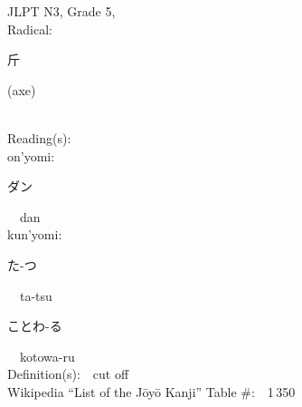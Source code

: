 \begin{multicols}{2}
{JLPT N3, Grade 5, \\Radical:\ \ {\begin{CJK}{UTF8}{min} 斤 \end{CJK}} (axe) } \\
Reading(s):\ \ \\
{\hspace*{1em}}on'yomi:\ \ \\
{\hspace*{2em}}{\begin{CJK}{UTF8}{min} ダン \end{CJK}}\ \ dan\ \ \\
{\hspace*{1em}}kun'yomi:\ \ \\
{\hspace*{2em}}{\begin{CJK}{UTF8}{min} た-つ \end{CJK}}\ \ ta-tsu\ \ \\
{\hspace*{2em}}{\begin{CJK}{UTF8}{min} ことわ-る \end{CJK}}\ \ kotowa-ru\ \ \\
Definition(s):\ \ cut off \\
Wikipedia ``List of the J\=oy\=o Kanji'' Table \#:\ \ 1\,350 \\
\ \ \\
\end{multicols}



